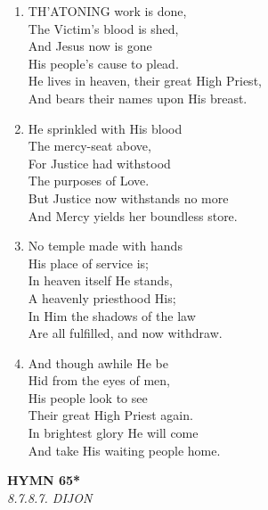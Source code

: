 \documentclass[11pt,a4paper]{article}
\begin{document}
\begin{enumerate}
    \item TH'ATONING work is done, \\
        The Victim's blood is shed, \\
        And Jesus now is gone \\
        His people's cause to plead. \\
        He lives in heaven, their great High Priest, \\
        And bears their names upon His breast.

    \item He sprinkled with His blood \\
        The mercy-seat above, \\
        For Justice had withstood \\
        The purposes of Love. \\
        But Justice now withstands no more \\
        And Mercy yields her boundless store.

    \item No temple made with hands \\
        His place of service is; \\
        In heaven itself He stands, \\
        A heavenly priesthood His; \\
        In Him the shadows of the law \\
        Are all fulfilled, and now withdraw.

    \item And though awhile He be \\
        Hid from the eyes of men, \\
        His people look to see \\
        Their great High Priest again. \\
        In brightest glory He will come \\
        And take His waiting people home.

\end{enumerate}

\newpage
\begin{center}
    {\Large \textbf{HYMN 65*}}
    \\
    \textit{8.7.8.7. DIJON}
\end{center}
\vspace{1em}
\end{document}
